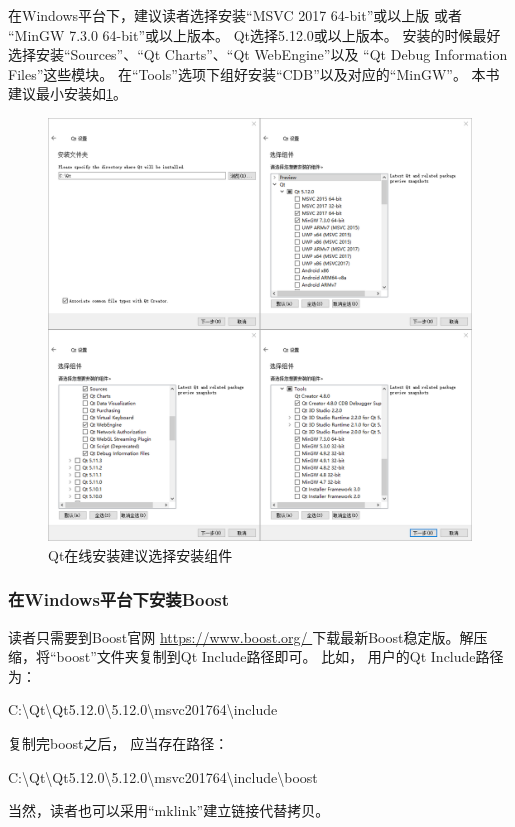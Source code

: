 在Windows平台下，建议读者选择安装“MSVC 2017 64-bit”或以上版
或者
“MinGW 7.3.0 64-bit”或以上版本。
Qt选择5.12.0或以上版本。
安装的时候最好选择安装“Sources”、“Qt Charts”、“Qt WebEngine”以及
“Qt Debug Information Files”这些模块。
在“Tools”选项下组好安装“CDB”以及对应的“MinGW”。
本书建议最小安装如\figurename\;\ref{p000001}。

\begin{figure}[ht] %
\centering %
\includegraphics[width=\textwidth]{chapter01/images/windows_qt_online_install.png} %
\caption{Qt在线安装建议选择安装组件} %
\label{p000001} %
\end{figure}



\subsubsection{
在Windows平台下安装Boost
}\label{ss000210}

读者只需要到Boost官网 \url{https://www.boost.org/
}下载最新Boost稳定版。解压缩，将“boost”文件夹复制到Qt Include路径即可。
比如，
用户的Qt Include路径为：
\begin{littlelongworld}
C:\textbackslash{}Qt\textbackslash{}Qt5.12.0\textbackslash{}5.12.0\textbackslash{}msvc2017\underline{\hspace{0.5em}}64\textbackslash{}include
\end{littlelongworld}
复制完boost之后，
应当存在路径：
\begin{littlelongworld}
C:\textbackslash{}Qt\textbackslash{}Qt5.12.0\textbackslash{}5.12.0\textbackslash{}msvc2017\underline{\hspace{0.5em}}64\textbackslash{}include\textbackslash{}boost
\end{littlelongworld}
\hspace*{\parindent}当然，读者也可以采用“mklink”建立链接代替拷贝。


